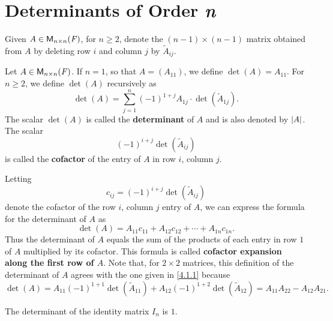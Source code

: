 \section{Determinants of Order \textit{n}}\label{sec:4.2}

\begin{defn}\label{4.2.1}
	Given \(A \in \mathsf{M}_{{n} \times n}({\mathit{F}})\), for \(n \geq 2\), denote the \((n - 1) \times (n - 1)\) matrix obtained from \(A\) by deleting row \(i\) and column \(j\) by \(\tilde{A}_{i j}\).
\end{defn}

\begin{defn}\label{4.2.2}
	Let \(A \in \mathsf{M}_{{n} \times n}({\mathit{F}})\).
	If \(n = 1\), so that \(A = (A_{1 1})\), we define \(\det(A) = A_{1 1}\).
	For \(n \geq 2\), we define \(\det(A)\) recursively as
	\[
		\det(A) = \sum_{j = 1}^n (-1)^{1 + j} A_{1 j} \cdot \det(\tilde{A}_{1 j}).
	\]
	The scalar \(\det(A)\) is called the \textbf{determinant} of \(A\) and is also denoted by \(\left\lvert A\right\rvert\).
	The scalar
	\[
		(-1)^{i + j} \det(\tilde{A}_{i j})
	\]
	is called the \textbf{cofactor} of the entry of \(A\) in row \(i\), column \(j\).

	Letting
	\[
		c_{i j} = (-1)^{i + j} \det(\tilde{A}_{i j})
	\]
	denote the cofactor of the row \(i\), column \(j\) entry of \(A\), we can express the formula for the determinant of \(A\) as
	\[
		\det(A) = A_{1 1} c_{1 1} + A_{1 2} c_{1 2} + \cdots + A_{1 n} c_{1 n}.
	\]
	Thus the determinant of \(A\) equals the sum of the products of each entry in row \(1\) of \(A\) multiplied by its cofactor.
	This formula is called \textbf{cofactor expansion along the first row of \(A\)}.
	Note that, for \(2 \times 2\) matrices, this definition of the determinant of \(A\) agrees with the one given in \cref{4.1.1} because
	\[
		\det(A) = A_{1 1} (-1)^{1 + 1} \det(\tilde{A}_{1 1}) + A_{1 2} (-1)^{1 + 2} \det(\tilde{A}_{1 2}) = A_{1 1} A_{2 2} - A_{1 2} A_{2 1}.
	\]
\end{defn}

\begin{eg}\label{4.2.3}
	The determinant of the identity matrix \(I_n\) is \(1\).
\end{eg}

